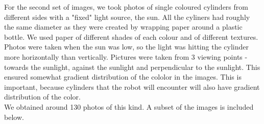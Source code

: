 \documentclass[12pt,a4paper]{article}
\begin{document}
	For the second set of images, we took photos of single coloured cylinders from different sides with a "fixed" light source, the sun. All the cyliners had roughly the same diameter as they were created by wrapping paper around a plastic bottle. We used paper of different shades of each colour and of different textures. \\
	
	Photos were taken when the sun was low, so the light was hitting the cylinder more horizontally than vertically. Pictures were taken from 3 viewing points - towards the sunlight, against the sunlight and perpendicular to the sunlight. This ensured somewhat gradient distribution of the cololor in the images. This is important, because cylinders that the robot will encounter will also have gradient distribution of the color.\\
	
	We obtained around 130 photos of this kind. A subset of the images is included below.
	
\end{document}
